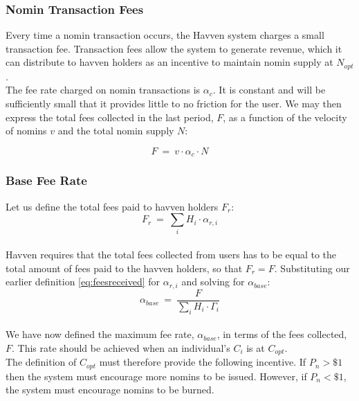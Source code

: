 \newpage

\subsubsection{Nomin Transaction Fees}
Every time a nomin transaction occurs, the Havven system charges a small
transaction fee. Transaction fees allow the system to generate revenue, which
it can distribute to havven holders as an incentive to maintain nomin supply
at $N_{opt}$. \\

\noindent The fee rate charged on nomin transactions is $\alpha_c$. It is
constant and will be sufficiently small that it provides little to no
friction for the user. We may then express the total fees collected in the
last period, $F$, as a function of the velocity of nomins $v$ and the total
nomin supply $N$:

\begin{equation}
    F \ = \ v \cdot \alpha_c \cdot N
\end{equation}

\subsubsection{Base Fee Rate}

Let us define the total fees paid to havven holders $F_{r}$: \\

\begin{equation}
F_{r} \ = \ \sum_{i} H_{i} \cdot \alpha_{r,i} \label{eq:totalfeesreceived}
\end{equation} \\

\noindent Havven requires that the total fees collected from users has to be
equal to the total amount of fees paid to the havven holders, so that $F_{r}
= F$. Substituting our earlier definition \eqref{eq:feesreceived} for
$\alpha_{r,i}$ and solving for $\alpha_{base} $: \\

\begin{equation}
\alpha_{base} \ = \ \frac{F}{\sum_{i} H_{i} \cdot \mathit{\Gamma}_{i}} \label{eq:10}
\end{equation} \\

\noindent We have now defined the maximum fee rate, $\alpha_{base}$, in terms
of the fees collected, $F$. This rate should be achieved when an individual's
$C_i$ is at $C_{opt}$. \\

\noindent The definition of $C_{opt}$ must therefore provide the following
incentive. If $P_n > \$1$ then the system must encourage more nomins to be
issued. However, if $P_n < \$1$, the system must encourage nomins to be
burned.
